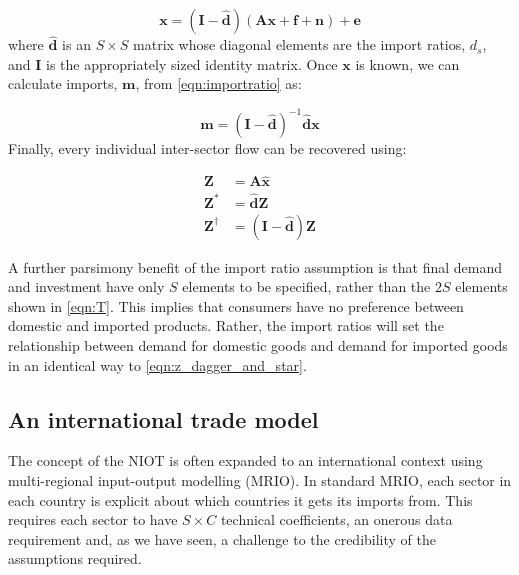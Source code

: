 \documentclass[a4paper]{article}
\begin{document}
\begin{equation}
    \boldsymbol{x} 
    = 
    (\boldsymbol{I} - \boldsymbol{\hat{d}})
    (
    \boldsymbol{Ax} + 
    \boldsymbol{f} + \boldsymbol{n}
    )
    + \boldsymbol{e}
    \label{eqn:xmodel}
\end{equation}
where $\boldsymbol{\hat{d}}$ is an $S \times S$ matrix whose diagonal elements are the import ratios, $d_s$, and $\boldsymbol{I}$ is the appropriately sized identity matrix.
Once $\boldsymbol{x}$ is known, we can calculate imports, $\boldsymbol{m}$, from \cref{eqn:importratio} as:

\begin{equation}
\boldsymbol{m} = 
(\boldsymbol{I} - 
\boldsymbol{\hat{d}})^{-1} 
\boldsymbol{\hat{d}}\boldsymbol{x}\label{eqn:mmodel}
\end{equation}
Finally, every individual inter-sector flow can be recovered using:

\begin{equation}\label{eqn:z_dagger_and_star}
    \begin{aligned}
        \boldsymbol{Z}& = \boldsymbol{A}\boldsymbol{\hat{x}} \\
        \boldsymbol{Z^*}& = \boldsymbol{\hat{d}}\boldsymbol{Z} \\
        \boldsymbol{Z^\dagger}& = (\boldsymbol{I} - \boldsymbol{\hat{d}}) \boldsymbol{Z}
    \end{aligned}
\end{equation}

A further parsimony benefit of the import ratio assumption is that final demand and investment have only $S$ elements to be specified, rather than the $2S$ elements shown in \cref{eqn:T}.
This implies that consumers have no preference between domestic and imported products.
Rather, the import ratios will set the relationship between demand for domestic goods and demand for imported goods in an identical way to \cref{eqn:z_dagger_and_star}.

\subsection{An international trade model}\label{sec:trade}
The concept of the NIOT is often expanded to an international context using multi-regional input-output modelling (MRIO). In standard MRIO, each sector in each country is explicit about which countries it gets its imports from. 
This requires each sector to have $S \times C$ technical coefficients, an onerous data requirement and, as we have seen, a challenge to the credibility of the assumptions required. 
\end{document}
